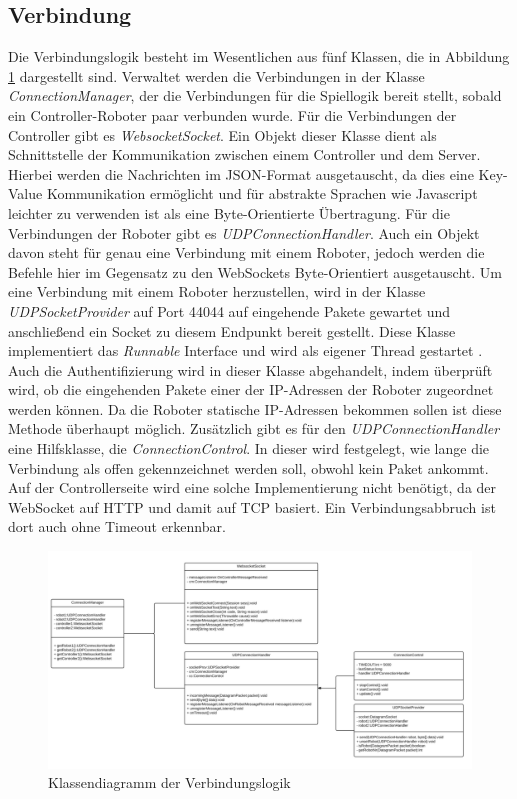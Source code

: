 \subsection{Verbindung}
Die Verbindungslogik besteht im Wesentlichen aus fünf Klassen, die in Abbildung \ref{fig:uml_verbindung} dargestellt sind. Verwaltet werden die Verbindungen in der Klasse \textit{ConnectionManager}, der die Verbindungen für die Spiellogik bereit stellt, sobald ein Controller-Roboter paar verbunden wurde. Für die Verbindungen der Controller gibt es \textit{WebsocketSocket}. Ein Objekt dieser Klasse dient als Schnittstelle der Kommunikation zwischen einem Controller und dem Server. Hierbei werden die Nachrichten im JSON-Format ausgetauscht, da dies eine Key-Value Kommunikation ermöglicht und für abstrakte Sprachen wie Javascript leichter zu verwenden ist als eine Byte-Orientierte Übertragung. Für die Verbindungen der Roboter gibt es \textit{UDPConnectionHandler}. Auch ein Objekt davon steht für genau eine Verbindung mit einem Roboter, jedoch werden die Befehle hier im Gegensatz zu den WebSockets Byte-Orientiert ausgetauscht. Um eine Verbindung mit einem Roboter herzustellen, wird in der Klasse \textit{UDPSocketProvider} auf Port 44044 auf eingehende Pakete gewartet und anschließend ein Socket zu diesem Endpunkt bereit gestellt. Diese Klasse implementiert das \textit{Runnable} Interface und wird als eigener Thread gestartet \cite{PROJEKT}.  Auch die Authentifizierung wird in dieser Klasse abgehandelt, indem überprüft wird, ob die eingehenden Pakete einer der IP-Adressen der Roboter zugeordnet werden können. Da die Roboter statische IP-Adressen bekommen sollen ist diese Methode überhaupt möglich. Zusätzlich gibt es für den \textit{UDPConnectionHandler} eine Hilfsklasse, die \textit{ConnectionControl}. In dieser wird festgelegt, wie lange die Verbindung als offen gekennzeichnet werden soll, obwohl kein Paket ankommt. Auf der Controllerseite wird eine solche Implementierung nicht benötigt, da der WebSocket auf HTTP und damit auf TCP basiert. Ein Verbindungsabbruch ist dort auch ohne Timeout erkennbar.


\begin{figure}[!h]
	\includegraphics[width=\textwidth]{images/uml_verbindung.pdf}
	\caption{Klassendiagramm der Verbindungslogik}
	\label{fig:uml_verbindung}
\end{figure}



